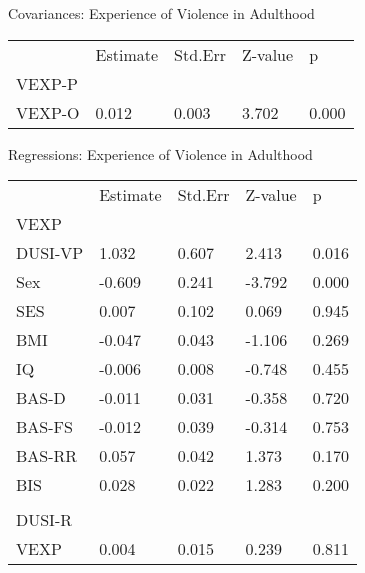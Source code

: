 \documentclass[utf8]{frontiersSCNS} %
\begin{document}
Covariances: Experience of Violence in Adulthood
\begin{table}[]
\begin{tabular}{lllll}
       & Estimate & Std.Err & Z-value & p     \\
VEXP-P &          &         &         &       \\
VEXP-O & 0.012    & 0.003   & 3.702   & 0.000
\end{tabular}
\end{table}

Regressions: Experience of Violence in Adulthood
\begin{table}[]
\begin{tabular}{lllll}
        & Estimate & Std.Err & Z-value & p     \\
VEXP    &          &         &         &       \\
DUSI-VP & 1.032    & 0.607   & 2.413   & 0.016 \\
Sex     & -0.609   & 0.241   & -3.792  & 0.000 \\
SES     & 0.007    & 0.102   & 0.069   & 0.945 \\
BMI     & -0.047   & 0.043   & -1.106  & 0.269 \\
IQ      & -0.006   & 0.008   & -0.748  & 0.455 \\
BAS-D   & -0.011   & 0.031   & -0.358  & 0.720 \\
BAS-FS  & -0.012   & 0.039   & -0.314  & 0.753 \\
BAS-RR  & 0.057    & 0.042   & 1.373   & 0.170 \\
BIS     & 0.028    & 0.022   & 1.283   & 0.200 \\
        &          &         &         &       \\
DUSI-R  &          &         &         &       \\
VEXP    & 0.004    & 0.015   & 0.239   & 0.811
\end{tabular}
\end{table}
\end{document}
